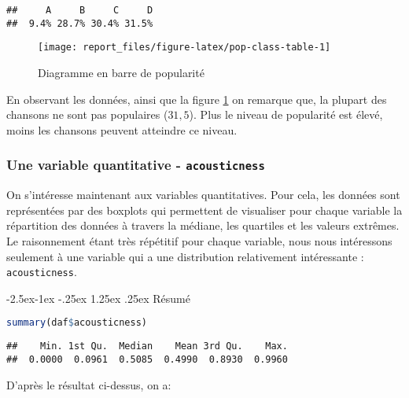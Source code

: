 \documentclass[
  11pt,
  xcolor = usenames,dvipsnames]{article}
\makeatletter
\newcommand{\passthrough}[1]{#1}
\renewcommand\paragraph{\@startsection{paragraph}{4}{\z@}%
        {-2.5ex\@plus -1ex \@minus -.25ex}%
        {1.25ex \@plus .25ex}%
        {\normalfont\normalsize\bfseries}}
\makeatother
\begin{document}
\begin{lstlisting}
##     A     B     C     D 
##  9.4% 28.7% 30.4% 31.5%
\end{lstlisting}

\begin{figure}

{\centering \texttt{[image: report\_files/figure-latex/pop-class-table-1]} 

}

\caption{Diagramme en barre de popularité}\label{fig:pop-class-table}
\end{figure}

En observant les données, ainsi que la figure \ref{fig:pop-class-table} on remarque que, la plupart des chansons ne sont pas populaires (\(31,5%
\)).
Plus le niveau de popularité est élevé, moins les chansons peuvent atteindre ce niveau.

\hypertarget{une-variable-quantitative---acousticness}{%
\subsubsection{\texorpdfstring{Une variable quantitative - \texttt{acousticness}}{Une variable quantitative - acousticness}}\label{une-variable-quantitative---acousticness}}

On s'intéresse maintenant aux variables quantitatives.
Pour cela, les données sont représentées par des boxplots qui permettent de visualiser pour chaque variable la répartition des données à travers la médiane,
les quartiles et les valeurs extrêmes. Le raisonnement étant très répétitif pour chaque variable,
nous nous intéressons seulement à une variable qui a une distribution relativement intéressante : \passthrough{\lstinline!acousticness!}.

\hypertarget{ruxe9sumuxe9}{%
\paragraph{Résumé}\label{ruxe9sumuxe9}}

\begin{lstlisting}[language=R]
summary(daf$acousticness)
\end{lstlisting}

\begin{lstlisting}
##    Min. 1st Qu.  Median    Mean 3rd Qu.    Max. 
##  0.0000  0.0961  0.5085  0.4990  0.8930  0.9960
\end{lstlisting}

D'après le résultat ci-dessus, on a:
\end{document}
